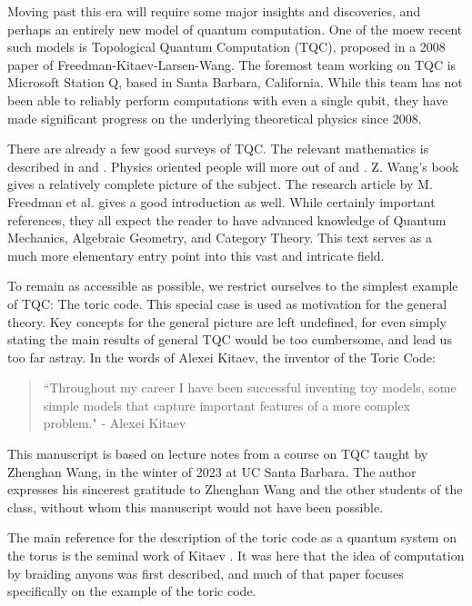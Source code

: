 \documentclass{article}
\theoremstyle{definition}
\numberwithin{figure}{section}
\begin{document}
Moving past this era will require some major insights and discoveries, and perhaps an entirely new model of quantum computation. One of the moew recent such models is Topological Quantum Computation (TQC), proposed in a 2008 paper of Freedman-Kitaev-Larsen-Wang. The foremost team working on TQC is Microsoft Station Q, based in Santa Barbara, California. While this team has not been able to reliably perform computations with even a single qubit, they have made significant progress on the underlying theoretical physics since 2008.

There are already a few good surveys of TQC. The relevant mathematics is described in \cite{bakalov2001lectures} and  \cite{rowell2018mathematics}. Physics oriented people will more out of \cite{preskill1999lecture} and \cite{nayak2008non}. Z. Wang's book \cite{wang2010topological} gives a relatively complete picture of the subject. The research article by M. Freedman et al. \cite{freedman2002simulation} gives a good introduction as well. While certainly important references, they all expect the reader to have advanced knowledge of Quantum Mechanics, Algebraic Geometry, and Category Theory. This text serves as a much more elementary entry point into this vast and intricate field.

To remain as accessible as possible, we restrict ourselves to the simplest example of TQC: The toric code. This special case is used as motivation for the general theory. Key concepts for the general picture are left undefined, for even simply stating the main results of general TQC would be too cumbersome, and lead us too far astray. In the words of Alexei Kitaev, the inventor of the Toric Code:

\begin{quote}
``Throughout my career I have been successful inventing toy models, some simple models that capture important features of a more complex problem." - Alexei Kitaev
\end{quote}

This manuscript is based on lecture notes from a course on TQC taught by Zhenghan Wang, in the winter of 2023 at UC Santa Barbara. The author expresses his sincerest gratitude to Zhenghan Wang and the other students of the class, without whom this manuscript would not have been possible.

The main reference for the description of the toric code as a quantum system on the torus is the seminal work of Kitaev \cite{kitaev2003fault}. It was here that the idea of computation by braiding anyons was first described, and much of that paper focuses specifically on the example of the toric code.
\end{document}
